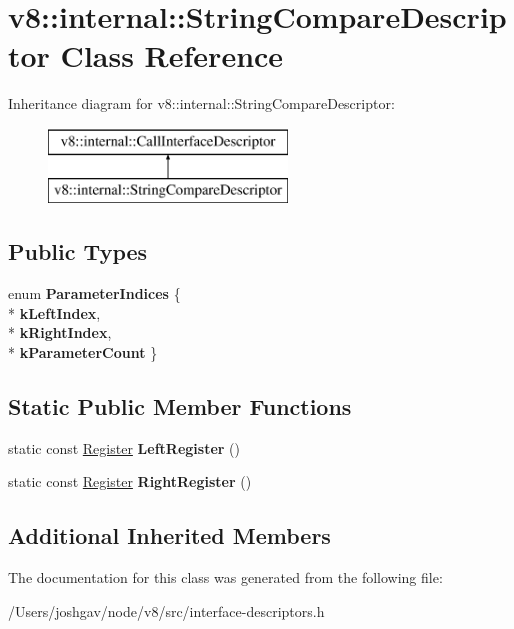 \hypertarget{classv8_1_1internal_1_1_string_compare_descriptor}{}\section{v8\+:\+:internal\+:\+:String\+Compare\+Descriptor Class Reference}
\label{classv8_1_1internal_1_1_string_compare_descriptor}
Inheritance diagram for v8\+:\+:internal\+:\+:String\+Compare\+Descriptor\+:\begin{figure}[H]
\begin{center}
\leavevmode
\includegraphics[height=2.000000cm]{classv8_1_1internal_1_1_string_compare_descriptor}
\end{center}
\end{figure}
\subsection*{Public Types}
\begin{DoxyCompactItemize}
\item 
enum {\bfseries Parameter\+Indices} \{ \\*
{\bfseries k\+Left\+Index}, 
\\*
{\bfseries k\+Right\+Index}, 
\\*
{\bfseries k\+Parameter\+Count}
 \}\hypertarget{classv8_1_1internal_1_1_string_compare_descriptor_a8218beb5d79d959a0279e70b4273777f}{}\label{classv8_1_1internal_1_1_string_compare_descriptor_a8218beb5d79d959a0279e70b4273777f}

\end{DoxyCompactItemize}
\subsection*{Static Public Member Functions}
\begin{DoxyCompactItemize}
\item 
static const \hyperlink{structv8_1_1internal_1_1_register}{Register} {\bfseries Left\+Register} ()\hypertarget{classv8_1_1internal_1_1_string_compare_descriptor_a259cf7b80adb1e5ddf7aba5aaba23ac2}{}\label{classv8_1_1internal_1_1_string_compare_descriptor_a259cf7b80adb1e5ddf7aba5aaba23ac2}

\item 
static const \hyperlink{structv8_1_1internal_1_1_register}{Register} {\bfseries Right\+Register} ()\hypertarget{classv8_1_1internal_1_1_string_compare_descriptor_aa1f26d6055b6df536347acb4fc3d51ea}{}\label{classv8_1_1internal_1_1_string_compare_descriptor_aa1f26d6055b6df536347acb4fc3d51ea}

\end{DoxyCompactItemize}
\subsection*{Additional Inherited Members}


The documentation for this class was generated from the following file\+:\begin{DoxyCompactItemize}
\item 
/\+Users/joshgav/node/v8/src/interface-\/descriptors.\+h\end{DoxyCompactItemize}
